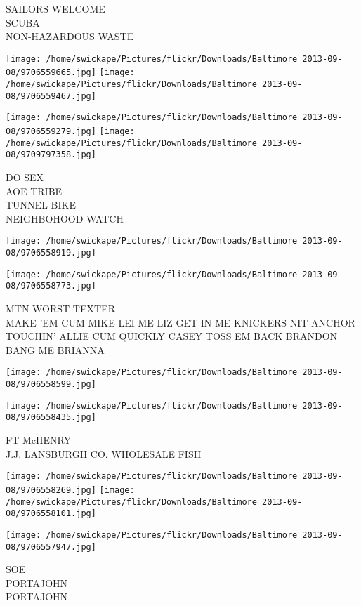 \documentclass[10pt,letterpaper]{article}
\begin{document}
SAILORS WELCOME\\
SCUBA\\
NON{-}HAZARDOUS WASTE
\pagebreak

\texttt{[image: /home/swickape/Pictures/flickr/Downloads/Baltimore 2013-09-08/9706559665.jpg]}
\texttt{[image: /home/swickape/Pictures/flickr/Downloads/Baltimore 2013-09-08/9706559467.jpg]}

\texttt{[image: /home/swickape/Pictures/flickr/Downloads/Baltimore 2013-09-08/9706559279.jpg]}
\texttt{[image: /home/swickape/Pictures/flickr/Downloads/Baltimore 2013-09-08/9709797358.jpg]}

DO SEX\\
AOE TRIBE\\
TUNNEL BIKE\\
NEIGHBOHOOD WATCH
\pagebreak

\texttt{[image: /home/swickape/Pictures/flickr/Downloads/Baltimore 2013-09-08/9706558919.jpg]}

\vspace{0.25in}
\texttt{[image: /home/swickape/Pictures/flickr/Downloads/Baltimore 2013-09-08/9706558773.jpg]}

MTN WORST TEXTER\\
MAKE 'EM CUM MIKE LEI ME LIZ GET IN ME KNICKERS NIT ANCHOR TOUCHIN' ALLIE CUM QUICKLY CASEY TOSS EM BACK BRANDON BANG ME BRIANNA
\pagebreak

\texttt{[image: /home/swickape/Pictures/flickr/Downloads/Baltimore 2013-09-08/9706558599.jpg]}

\vspace{0.25in}
\texttt{[image: /home/swickape/Pictures/flickr/Downloads/Baltimore 2013-09-08/9706558435.jpg]}

FT McHENRY\\
J.J. LANSBURGH CO. WHOLESALE FISH
\pagebreak

\texttt{[image: /home/swickape/Pictures/flickr/Downloads/Baltimore 2013-09-08/9706558269.jpg]}
\texttt{[image: /home/swickape/Pictures/flickr/Downloads/Baltimore 2013-09-08/9706558101.jpg]}

\vspace{0.25in}
\texttt{[image: /home/swickape/Pictures/flickr/Downloads/Baltimore 2013-09-08/9706557947.jpg]}

SOE\\
PORTAJOHN\\
PORTAJOHN
\pagebreak
\end{document}
